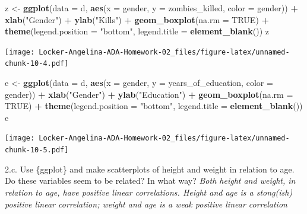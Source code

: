 \documentclass[]{article}
\newenvironment{Shaded}{\begin{snugshade}}{\end{snugshade}}
\newcommand{\KeywordTok}[1]{\textcolor[rgb]{0.13,0.29,0.53}{\textbf{#1}}}
\newcommand{\DataTypeTok}[1]{\textcolor[rgb]{0.13,0.29,0.53}{#1}}
\newcommand{\StringTok}[1]{\textcolor[rgb]{0.31,0.60,0.02}{#1}}
\newcommand{\OtherTok}[1]{\textcolor[rgb]{0.56,0.35,0.01}{#1}}
\newcommand{\OperatorTok}[1]{\textcolor[rgb]{0.81,0.36,0.00}{\textbf{#1}}}
\newcommand{\NormalTok}[1]{#1}
\begin{document}
\begin{Shaded}
\begin{Highlighting}[]
\NormalTok{z <-}\StringTok{ }\KeywordTok{ggplot}\NormalTok{(}\DataTypeTok{data =}\NormalTok{ d, }\KeywordTok{aes}\NormalTok{(}\DataTypeTok{x =}\NormalTok{ gender, }\DataTypeTok{y =}\NormalTok{ zombies_killed, }\DataTypeTok{color =}\NormalTok{ gender)) }\OperatorTok{+}\StringTok{ }\KeywordTok{xlab}\NormalTok{(}\StringTok{"Gender"}\NormalTok{) }\OperatorTok{+}\StringTok{ }\KeywordTok{ylab}\NormalTok{(}\StringTok{"Kills"}\NormalTok{) }\OperatorTok{+}\StringTok{ }\KeywordTok{geom_boxplot}\NormalTok{(}\DataTypeTok{na.rm =} \OtherTok{TRUE}\NormalTok{) }\OperatorTok{+}\StringTok{ }\KeywordTok{theme}\NormalTok{(}\DataTypeTok{legend.position =} \StringTok{"bottom"}\NormalTok{, }\DataTypeTok{legend.title =} \KeywordTok{element_blank}\NormalTok{())}
\NormalTok{z}
\end{Highlighting}
\end{Shaded}

\texttt{[image: Locker-Angelina-ADA-Homework-02\_files/figure-latex/unnamed-chunk-10-4.pdf]}

\begin{Shaded}
\begin{Highlighting}[]
\NormalTok{e <-}\StringTok{ }\KeywordTok{ggplot}\NormalTok{(}\DataTypeTok{data =}\NormalTok{ d, }\KeywordTok{aes}\NormalTok{(}\DataTypeTok{x =}\NormalTok{ gender, }\DataTypeTok{y =}\NormalTok{ years_of_education, }\DataTypeTok{color =}\NormalTok{ gender)) }\OperatorTok{+}\StringTok{ }\KeywordTok{xlab}\NormalTok{(}\StringTok{"Gender"}\NormalTok{) }\OperatorTok{+}\StringTok{ }\KeywordTok{ylab}\NormalTok{(}\StringTok{"Education"}\NormalTok{) }\OperatorTok{+}\StringTok{ }\KeywordTok{geom_boxplot}\NormalTok{(}\DataTypeTok{na.rm =} \OtherTok{TRUE}\NormalTok{) }\OperatorTok{+}\StringTok{ }\KeywordTok{theme}\NormalTok{(}\DataTypeTok{legend.position =} \StringTok{"bottom"}\NormalTok{, }\DataTypeTok{legend.title =} \KeywordTok{element_blank}\NormalTok{())}
\NormalTok{e}
\end{Highlighting}
\end{Shaded}

\texttt{[image: Locker-Angelina-ADA-Homework-02\_files/figure-latex/unnamed-chunk-10-5.pdf]}

2.c. Use \{ggplot\} and make scatterplots of height and weight in
relation to age. Do these variables seem to be related? In what way?
\emph{Both height and weight, in relation to age, have positive linear
correlations. Height and age is a stong(ish) positive linear
correlation; weight and age is a weak positive linear correlation}
\end{document}
